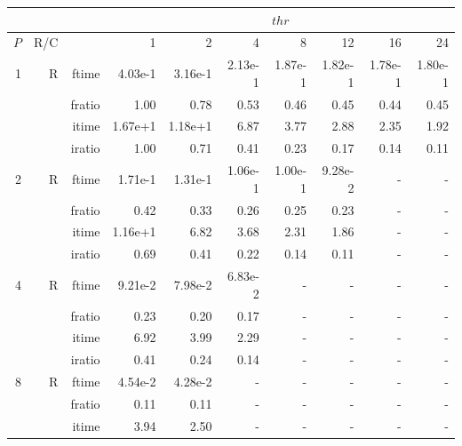 \documentclass[a4paper]{article}
\begin{document}
\begin{table}[htbp]
\begin{center}
\begin{small}
\begin{tabular}{|r|r|r|r|r|r|r|r|r|r|}
\hline 
     & & & \multicolumn{7}{c|}{$thr$} \\ \hline
    $P$ & R/C &  & 1           & 2    & 4    & 8    & 12   & 16    & 24  \\ \hline\hline
   1 &  R &   ftime &    4.03e-1 &    3.16e-1 &    2.13e-1 &    1.87e-1 &    1.82e-1 &    1.78e-1 &    1.80e-1 \\
             &             &  fratio &    1.00 &    0.78 &    0.53 &    0.46 &    0.45 &    0.44 &    0.45 \\
             &             &  itime &    1.67e+1 &   1.18e+1 &   6.87  &    3.77  &    2.88  &    2.35  &    1.92  \\
             &             &  iratio &    1.00 &   0.71 &    0.41 &    0.23 &    0.17 &    0.14 &    0.11 \\\hline
   2 &  R &   ftime &    1.71e-1 &    1.31e-1 &    1.06e-1 &    1.00e-1 &    9.28e-2 &      - &      - \\
             &             &  fratio &    0.42 &    0.33 &    0.26 &    0.25 &    0.23 &      - &      - \\
             &             &  itime &    1.16e+1 &   6.82  &    3.68  &    2.31  &    1.86  &      - &      - \\
             &             &  iratio &    0.69 &   0.41 &    0.22 &    0.14 &    0.11 &      - &      - \\\hline
   4 &  R &   ftime &    9.21e-2 &    7.98e-2 &    6.83e-2 &      - &      - &      - &      - \\
             &             &  fratio &    0.23 &    0.20 &    0.17 &      - &      - &      - &      - \\
             &             &  itime &    6.92  &    3.99  &    2.29  &      - &      - &      - &      - \\
             &             &  iratio &    0.41 &    0.24 &    0.14 &      - &      - &      - &      - \\\hline
   8 &   R &   ftime &    4.54e-2 &    4.28e-2 &      - &      - &      - &      - &      - \\
             &             &  fratio &    0.11 &   0.11 &      - &      - &      - &      - &      - \\
             &             &  itime &    3.94  &    2.50  &      - &      - &      - &      - &      - \\

\end{tabular}
\end{small}
\end{center}
\end{table}
\end{document}
